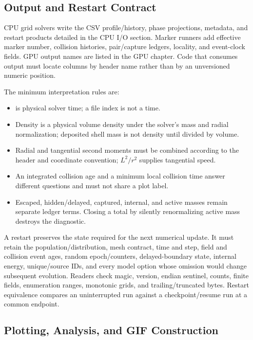 \subsection{Output and Restart Contract}
\label{sec:io-shared}

CPU grid solvers write the CSV profile/history, phase projections, metadata,
and restart products detailed in the CPU I/O section.  Marker runners add
effective marker number, collision histories, pair/capture ledgers, locality,
and event-clock fields.  GPU output names are listed in the GPU chapter.  Code
that consumes output must locate columns by header name rather than by an
unversioned numeric position.

The minimum interpretation rules are:
\begin{itemize}
\item {} is physical solver time; a file index is not a time.
\item Density is a physical volume density under the solver's mass and radial
normalization; deposited shell mass is not density until divided by volume.
\item Radial and tangential second moments must be combined according to the
header and coordinate convention; \(L^2/r^2\) supplies tangential speed.
\item An integrated collision age and a minimum local collision time answer
different questions and must not share a plot label.
\item Escaped, hidden/delayed, captured, internal, and active masses remain
separate ledger terms.  Closing a total by silently renormalizing active mass
destroys the diagnostic.
\end{itemize}

A restart preserves the state required for the next numerical update.
It must retain the population/distribution, mesh contract, time and step,
field and collision event ages, random epoch/counters, delayed-boundary state,
internal energy, unique/source IDs, and every model option whose omission
would change subsequent evolution.  Readers check magic, version, endian
sentinel, counts, finite fields, enumeration ranges, monotonic grids, and
trailing/truncated bytes.  Restart equivalence compares an uninterrupted run
against a checkpoint/resume run at a common endpoint.

\subsection{Plotting, Analysis, and GIF Construction}
\label{sec:plotting-shared}

